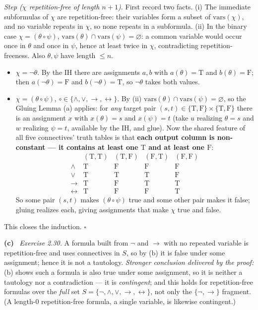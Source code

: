 \documentclass[11pt]{article}
\newcommand{\T}{\mathrm{T}}
\newcommand{\F}{\mathrm{F}}
\newcommand{\TF}{\{\T,\F\}}
\newcommand{\Sfive}{\{\lnot,\land,\lor,\to,\leftrightarrow\}}
\newcommand{\vars}{\mathrm{vars}}
\newcommand{\bin}{\mathbin{\circ}}
\newcommand{\solpart}[1]{\smallskip\noindent\textbf{(#1)}\ }
\begin{document}
\emph{Step ($\chi$ repetition-free of length $n+1$).} First record two facts.
(i) The immediate subformulas of $\chi$ are repetition-free: their variables form a
subset of $\vars(\chi)$, and no variable repeats in $\chi$, so none repeats in a
subformula. (ii) In the binary case $\chi=(\theta\bin\psi)$, $\vars(\theta)\cap
\vars(\psi)=\varnothing$: a common variable would occur once in $\theta$ and once
in $\psi$, hence at least twice in $\chi$, contradicting repetition-freeness. Also
$\theta,\psi$ have length $\le n$.
\begin{itemize}[nosep]
\item $\chi=\lnot\theta$. By the IH there are assignments $a,b$ with $a(\theta)=\T$
and $b(\theta)=\F$; then $a(\lnot\theta)=\F$ and $b(\lnot\theta)=\T$, so $\lnot
\theta$ takes both values.
\item $\chi=(\theta\bin\psi)$, $\bin\in\{\land,\lor,\to,\leftrightarrow\}$. By (ii)
$\vars(\theta)\cap\vars(\psi)=\varnothing$, so the Gluing Lemma (a) applies: for
\emph{any} target pair $(s,t)\in\TF\times\TF$ there is an assignment $x$ with
$x(\theta)=s$ and $x(\psi)=t$ (take $u$ realizing $\theta=s$ and $w$ realizing
$\psi=t$, available by the IH, and glue). Now the shared feature of all five
connectives' truth tables is that \textbf{each output column is non-constant --- it
contains at least one $\T$ and at least one $\F$}:
\[
\begin{array}{c|cccc}
 & (\T,\T) & (\T,\F) & (\F,\T) & (\F,\F)\\\hline
\land & \T & \F & \F & \F\\
\lor & \T & \T & \T & \F\\
\to & \T & \F & \T & \T\\
\leftrightarrow & \T & \F & \F & \T
\end{array}
\]
So some pair $(s,t)$ makes $(\theta\bin\psi)$ true and some other pair makes it
false; gluing realizes each, giving assignments that make $\chi$ true and false.
\end{itemize}
This closes the induction. \hfill$\square$

\solpart{c} \emph{Exercise 2.30.} A formula built from $\lnot$ and $\to$ with no
repeated variable is repetition-free and uses connectives in $S$, so by (b) it is
false under some assignment; hence it is not a tautology. \emph{Stronger conclusion
delivered by the proof:} (b) shows such a formula is also true under some
assignment, so it is neither a tautology nor a contradiction --- it is
\emph{contingent}; and this holds for repetition-free formulas over the \emph{full}
set $S=\Sfive$, not only the $\{\lnot,\to\}$ fragment. (A length-$0$ repetition-free
formula, a single variable, is likewise contingent.)
\end{document}
